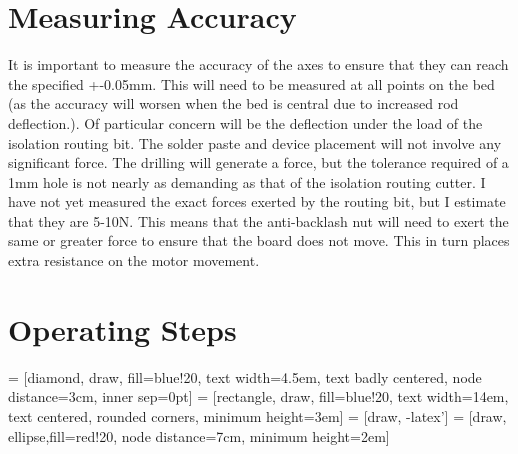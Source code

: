 \documentclass[a4paper,11pt]{article}  %
\begin{document}
\section{Measuring Accuracy}
It is important to measure the accuracy of the axes to ensure that they can reach the specified +-0.05mm. This will need to be measured
at all points on the bed (as the accuracy will worsen when the bed is central due to increased rod deflection.). Of particular concern will be
the deflection under the load of the isolation routing bit. The solder paste and device placement will not involve any significant force. The 
drilling will generate a force, but the tolerance required of a 1mm hole is not nearly as demanding as that of the isolation routing cutter.
I have not yet measured the exact forces exerted by the routing bit, but I estimate that they are 5-10N. This means that the anti-backlash nut
will need to exert the same or greater force to ensure that the board does not move. This in turn places extra resistance on the motor movement.

\section{Operating Steps}

 = [diamond, draw, fill=blue!20, 
    text width=4.5em, text badly centered, node distance=3cm, inner sep=0pt]
 = [rectangle, draw, fill=blue!20, 
    text width=14em, text centered, rounded corners, minimum height=3em]
 = [draw, -latex']
 = [draw, ellipse,fill=red!20, node distance=7cm,
    minimum height=2em]
    
\end{document}
